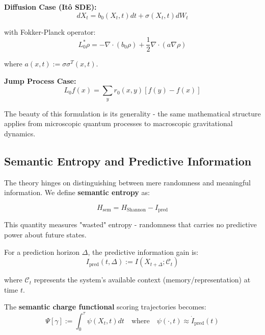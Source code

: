 \documentclass[12pt]{article}
\begin{document}
\textbf{Diffusion Case (Itô SDE):}
\begin{equation}
dX_t = b_0(X_t,t)dt + \sigma(X_t,t)dW_t \tag{1.1}
\end{equation}

with Fokker-Planck operator:
\begin{equation}
L_0^* \rho = -\nabla \cdot (b_0\rho) + \frac{1}{2}\nabla \cdot (a \nabla \rho) \tag{1.2}
\end{equation}

where $a(x,t) := \sigma \sigma^T(x,t)$.

\textbf{Jump Process Case:} 
\begin{equation}
L_0 f(x) = \sum_y r_0(x,y)[f(y) - f(x)] \tag{1.3}
\end{equation}

The beauty of this formulation is its generality - the same mathematical structure applies from microscopic quantum processes to macroscopic gravitational dynamics.

\subsection{Semantic Entropy and Predictive Information}

The theory hinges on distinguishing between mere randomness and meaningful information. We define \textbf{semantic entropy} as:

\begin{equation}
H_{\mathrm{sem}} = H_{\mathrm{Shannon}} - I_{\mathrm{pred}} \tag{1.4}
\end{equation}

This quantity measures "wasted" entropy - randomness that carries no predictive power about future states.

For a prediction horizon $\Delta$, the predictive information gain is:
\begin{equation}
I_{\mathrm{pred}}(t,\Delta) := I(X_{t+\Delta}; \mathcal{C}_t) \tag{1.5}
\end{equation}

where $\mathcal{C}_t$ represents the system's available context (memory/representation) at time $t$.

The \textbf{semantic charge functional} scoring trajectories becomes:
\begin{equation}
\Psi[\gamma] := \int_0^\tau \psi(X_t,t)dt \quad \text{where} \quad \psi(\cdot,t) \approx \dot I_{\mathrm{pred}}(t) \tag{1.6}
\end{equation}
\end{document}
